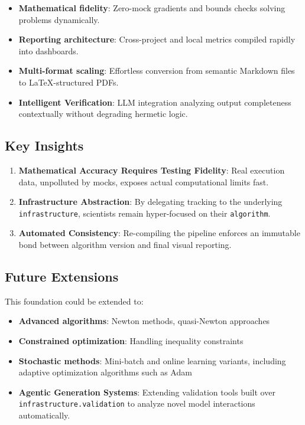 \documentclass[
]{article}
\providecommand{\tightlist}{%
  \setlength{\itemsep}{0pt}\setlength{\parskip}{0pt}}
\begin{document}
\begin{itemize}
\tightlist
\item
  \textbf{Mathematical fidelity}: Zero-mock gradients and bounds checks
  solving problems dynamically.
\item
  \textbf{Reporting architecture}: Cross-project and local metrics
  compiled rapidly into dashboards.
\item
  \textbf{Multi-format scaling}: Effortless conversion from semantic
  Markdown files to LaTeX-structured PDFs.
\item
  \textbf{Intelligent Verification}: LLM integration analyzing output
  completeness contextually without degrading hermetic logic.
\end{itemize}

\subsection{Key Insights}\label{key-insights}

\begin{enumerate}
\def\labelenumi{\arabic{enumi}.}
\tightlist
\item
  \textbf{Mathematical Accuracy Requires Testing Fidelity}: Real
  execution data, unpolluted by mocks, exposes actual computational
  limits fast.
\item
  \textbf{Infrastructure Abstraction}: By delegating tracking to the
  underlying \texttt{infrastructure}, scientists remain hyper-focused on
  their \texttt{algorithm}.
\item
  \textbf{Automated Consistency}: Re-compiling the pipeline enforces an
  immutable bond between algorithm version and final visual reporting.
\end{enumerate}

\subsection{Future Extensions}\label{future-extensions}

This foundation could be extended to:

\begin{itemize}
\tightlist
\item
  \textbf{Advanced algorithms}: Newton methods, quasi-Newton approaches
\item
  \textbf{Constrained optimization}: Handling inequality constraints
\item
  \textbf{Stochastic methods}: Mini-batch and online learning variants,
  including adaptive optimization algorithms such as Adam
  \citep{kingma2014adam}
\item
  \textbf{Agentic Generation Systems}: Extending validation tools built
  over \texttt{infrastructure.validation} to analyze novel model
  interactions automatically.
\end{itemize}
\end{document}
